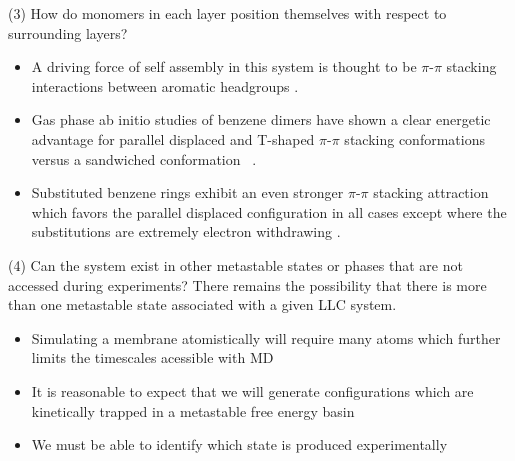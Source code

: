 \documentclass{article}
\begin{document}
    (3) How do monomers in each layer position themselves with respect to surrounding 
    layers?
    \begin{itemize}
      \item A driving force of self assembly in this system is thought to be $\pi$-$\pi$
      stacking interactions between aromatic headgroups \cite{gazit_possible_2002}. 
      \item Gas phase ab initio studies of benzene dimers have shown a clear energetic
      advantage for parallel displaced and T-shaped $\pi$-$\pi$ stacking conformations versus a
      sandwiched conformation ~\cite{sinnokrot_estimates_2002}.
      \item Substituted benzene rings exhibit an even stronger $\pi$-$\pi$ stacking 
      attraction which favors the parallel displaced configuration in all cases
      except where the substitutions are extremely electron withdrawing
      \cite{waller_hybrid_2006,ringer_effect_2006}.
    \end{itemize}
    
 
  (4) Can the system exist in other metastable states or phases that are not
  accessed during experiments?
  There remains the possibility that there is more than one metastable state 
  associated with a given LLC system.
  \begin{itemize}
    \item Simulating a membrane atomistically will require many atoms which further
    limits the timescales acessible with MD
    \item It is reasonable to expect that we will generate configurations which 
    are kinetically trapped in a metastable free energy basin
    \item We must be able to identify which state is produced experimentally
  \end{itemize}
  
\end{document}

